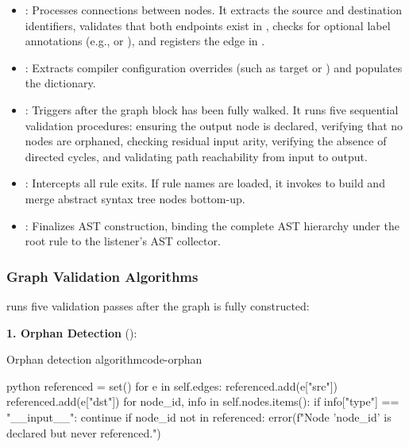 \documentclass{nngraph-en}
\begin{document}
\begin{itemize}
    \item \textbf{}: Processes connections between nodes. It extracts the source and destination identifiers, validates that both endpoints exist in , checks for optional label annotations (e.g.,  or ), and registers the edge in .
    \item \textbf{}: Extracts compiler configuration overrides (such as target  or ) and populates the  dictionary.
    \item \textbf{}: Triggers after the graph block has been fully walked. It runs five sequential validation procedures: ensuring the output node is declared, verifying that no nodes are orphaned, checking residual input arity, verifying the absence of directed cycles, and validating path reachability from input to output.
    \item \textbf{}: Intercepts all rule exits. If rule names are loaded, it invokes  to build and merge abstract syntax tree nodes bottom-up.
    \item \textbf{}: Finalizes AST construction, binding the complete AST hierarchy under the root rule to the listener's AST collector.
\end{itemize}

\subsubsection{Graph Validation Algorithms}

 runs five validation passes after the graph
is fully constructed:

\textbf{1. Orphan Detection} ():

\begin{codebox}{Orphan detection algorithm}{code-orphan}
\begin{amzcode}{python}
referenced = set()
for e in self.edges:
    referenced.add(e["src"])
    referenced.add(e["dst"])
for node_id, info in self.nodes.items():
    if info["type"] == "__input__":
        continue
    if node_id not in referenced:
        error(f"Node '{node_id}' is declared but never referenced.")
\end{amzcode}
\end{codebox}
\end{document}

